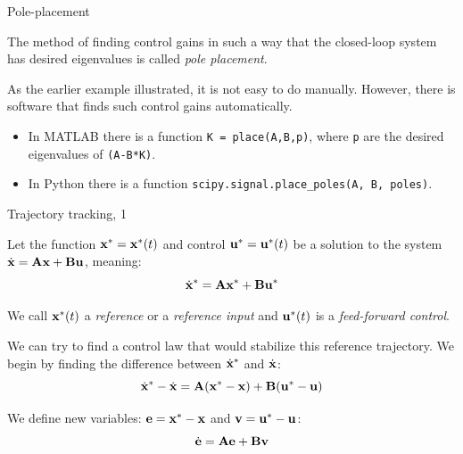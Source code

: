 \documentclass{beamer}
\begin{document}
\begin{frame}{Pole-placement}
	\begin{flushleft}
		
		The method of finding control gains in such a way that the closed-loop system has desired eigenvalues is called \emph{pole placement}.
		
		\bigskip
		
		As the earlier example illustrated, it is not easy to do manually. However, there is software that finds such control gains automatically.
		
		\bigskip
		
		\begin{itemize}
			\item  In MATLAB there is a function \texttt{K = place(A,B,p)}, where \texttt{p} are the desired eigenvalues of \texttt{(A-B*K)}.
			
			\item In Python there is a function \texttt{scipy.signal.place\_poles(A, B, poles)}.
		\end{itemize}
		

		
		
	\end{flushleft}
\end{frame}










\begin{frame}{Trajectory tracking, 1}
	\begin{flushleft}
		
		Let the function $\mathbf{x}^* = \mathbf{x}^*(t)$ and control $\mathbf{u}^* = \mathbf{u}^*(t)$ be a solution to the system $\dot{\mathbf{x}} = \mathbf{A}\mathbf{x} + \mathbf{B}\mathbf{u}$, meaning:
		\begin{equation}
			\dot{\mathbf{x}}^* = \mathbf{A}\mathbf{x}^* + \mathbf{B}\mathbf{u}^*
		\end{equation}
	
		We call $\mathbf{x}^*(t)$ a \emph{reference} or a \emph{reference input} and $\mathbf{u}^*(t)$ is a \emph{feed-forward control}.
		
		\bigskip
		
		We can try to find a control law that would stabilize this reference trajectory. We begin by finding the difference between $\dot{\mathbf{x}}^*$ and $\dot{\mathbf{x}}$:
		\begin{equation}
			\dot{\mathbf{x}}^* - \dot{\mathbf{x}}= \mathbf{A}(\mathbf{x}^*-\mathbf{x}) + \mathbf{B}(\mathbf{u}^*-\mathbf{u})
		\end{equation}
		
		We define new variables: $\mathbf{e} = \mathbf{x}^* - \mathbf{x}$ and $\mathbf{v} = \mathbf{u}^* - \mathbf{u}$:
		\begin{equation}
			\dot{\mathbf{e}} = \mathbf{A}\mathbf{e} + \mathbf{B}\mathbf{v}
		\end{equation}
		
	\end{flushleft}
\end{frame}
\end{document}
